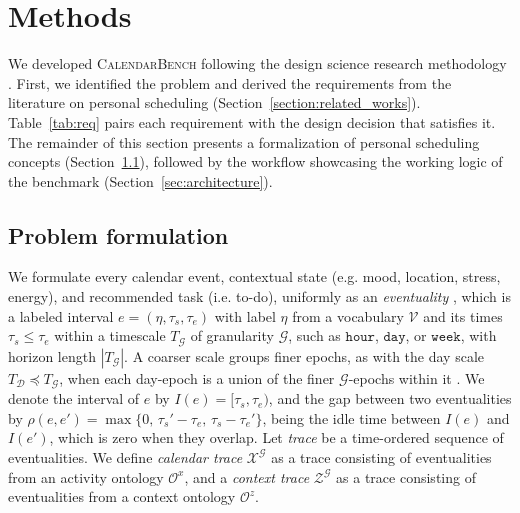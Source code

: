 \documentclass[runningheads]{llncs}
\begin{document}
\section{Methods}
\label{sec:method}
We developed \textsc{CalendarBench} following the design science research methodology \citep{wieringa_design_2014}. First, we identified the problem and derived the requirements from the literature on personal scheduling (Section~\ref{section:related_works}). Table~\ref{tab:req} pairs each requirement with the design decision that satisfies it. The remainder of this section presents %
a formalization of personal scheduling concepts (Section~\ref{sec:math}), followed by the workflow showcasing the working logic of the benchmark (Section~\ref{sec:architecture}). 


\subsection{Problem formulation}
\label{sec:math}

We formulate every calendar event, contextual state (e.g. mood, location, stress, energy), and recommended task (i.e. to-do), uniformly as an \emph{eventuality} \citep{GALTON200525}, which is a labeled interval $e=(\eta,\tau_s,\tau_e)$ with label $\eta$ from a vocabulary $\mathcal{V}$ and its times $\tau_s\le\tau_e$ within a timescale $T_{\mathcal{G}}$ of granularity $\mathcal{G}$, such as $\texttt{hour}$, $\texttt{day}$, or $\texttt{week}$, with horizon length $|T_{\mathcal{G}}|$. A coarser scale groups finer epochs, as with the day scale $T_{\mathcal{D}}\preceq T_{\mathcal{G}}$, when each day-epoch is a union of the finer $\mathcal{G}$-epochs within it \citep{Bettini2009}. We denote the interval of $e$ by $I(e)=[\tau_s,\tau_e)$, and the gap between two eventualities by $\rho(e,e')=\max\{0,\,\tau_s'-\tau_e,\,\tau_s-\tau_e'\}$, being the idle time between $I(e)$ and $I(e')$, which is zero when they overlap. Let \emph{trace} be a time-ordered sequence of eventualities. We define \textit{calendar trace} $\mathcal{X}^{\mathcal{G}}$ as a trace consisting of eventualities from an activity ontology $\mathcal{O}^{x}$, and a \textit{context trace} $\mathcal{Z}^{\mathcal{G}}$ as a trace consisting of eventualities from a context ontology $\mathcal{O}^{z}$. 
\end{document}
